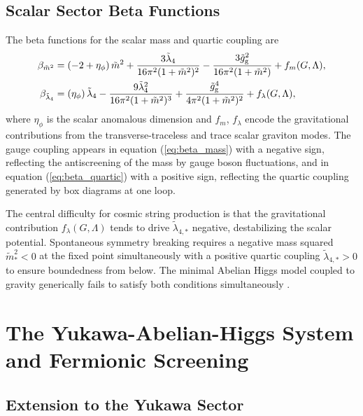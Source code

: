 \documentclass[12pt,a4paper]{article}
\begin{document}
\subsection{Scalar Sector Beta Functions}

The beta functions for the scalar mass and quartic coupling are
\begin{align}
\beta_{\tilde m^2}
&= \left(-2 + \eta_\phi\right)\tilde m^2
+ \frac{3\tilde\lambda_4}{16\pi^2(1+\tilde m^2)^2}
- \frac{3\tilde g_{\rm g}^2}{16\pi^2(1+\tilde m^2)}
+ f_m(G,\Lambda),
\label{eq:beta_mass}
\\
\beta_{\tilde\lambda_4}
&= \left(\eta_\phi\right)\tilde\lambda_4
- \frac{9\tilde\lambda_4^2}{16\pi^2(1+\tilde m^2)^3}
+ \frac{\tilde g_{\rm g}^4}{4\pi^2(1+\tilde m^2)^2}
+ f_\lambda(G,\Lambda),
\label{eq:beta_quartic}
\end{align}
where $\eta_\phi$ is the scalar anomalous dimension and $f_m$, $f_\lambda$
encode the gravitational contributions from the transverse-traceless and trace
scalar graviton modes. The gauge coupling appears in equation (\ref{eq:beta_mass})
with a negative sign, reflecting the antiscreening of the mass by gauge boson
fluctuations, and in equation (\ref{eq:beta_quartic}) with a positive sign,
reflecting the quartic coupling generated by box diagrams at one loop.

The central difficulty for cosmic string production is that the gravitational
contribution $f_\lambda(G,\Lambda)$ tends to drive $\tilde\lambda_{4,*}$
negative, destabilizing the scalar potential. Spontaneous symmetry breaking
requires a negative mass squared $\tilde m^2_* < 0$ at the fixed point
simultaneously with a positive quartic coupling $\tilde\lambda_{4,*} > 0$
to ensure boundedness from below. The minimal Abelian Higgs model coupled to
gravity generically fails to satisfy both conditions simultaneously
\cite{EichhornLinoMiqueleto2023}.

\section{The Yukawa-Abelian-Higgs System and Fermionic Screening}
\label{sec:yukawa}

\subsection{Extension to the Yukawa Sector}
\end{document}
